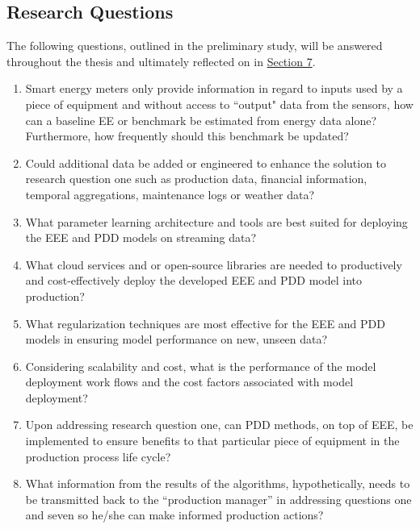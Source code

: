\subsection{Research Questions}

The following questions, outlined in the preliminary study, will be answered throughout the thesis and ultimately reflected on in \hyperlink{section.7}{Section 7}. 

\begin{enumerate}

    \item Smart energy meters only provide information in regard to inputs used by a piece of equipment and without access to ``output" data from the sensors, how can a baseline EE or benchmark be estimated from energy data alone? Furthermore, how frequently should this benchmark be updated?
    
    \item Could additional data be added or engineered to enhance the solution to research question one such as production data, financial information, temporal aggregations, maintenance logs or weather data?
    
    \item What parameter learning architecture and tools are best suited for deploying the EEE and PDD models on streaming data?
    
    \item What cloud services and or open-source libraries are needed to productively and cost-effectively deploy the developed EEE and PDD model into production? 
    
    \item What regularization techniques are most effective for the EEE and PDD models in ensuring model performance on new, unseen data?
    
    \item Considering scalability and cost, what is the performance of the model deployment work flows and the cost factors associated with model deployment?
    
    \item Upon addressing research question one, can PDD methods, on top of EEE, be implemented to ensure benefits to that particular piece of equipment in the production process life cycle?
    
    \item What information from the results of the algorithms, hypothetically, needs to be transmitted back to the “production manager” in addressing questions one and seven so he/she can make informed production actions?
    
\end{enumerate}

